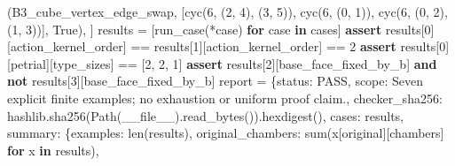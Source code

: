 \documentclass[
  10pt,
  letterpaper,
]{article}
\newenvironment{Shaded}{}{}
\newcommand{\BuiltInTok}[1]{\textcolor[rgb]{0.00,0.50,0.00}{#1}}
\newcommand{\ControlFlowTok}[1]{\textcolor[rgb]{0.00,0.44,0.13}{\textbf{#1}}}
\newcommand{\DecValTok}[1]{\textcolor[rgb]{0.25,0.63,0.44}{#1}}
\newcommand{\KeywordTok}[1]{\textcolor[rgb]{0.00,0.44,0.13}{\textbf{#1}}}
\newcommand{\NormalTok}[1]{#1}
\newcommand{\OperatorTok}[1]{\textcolor[rgb]{0.40,0.40,0.40}{#1}}
\newcommand{\StringTok}[1]{\textcolor[rgb]{0.25,0.44,0.63}{#1}}
\newcommand{\VariableTok}[1]{\textcolor[rgb]{0.10,0.09,0.49}{#1}}
\begin{document}
\begin{Shaded}
\begin{Highlighting}[]
\NormalTok{        (}\StringTok{\textquotesingle{}B3\_cube\_vertex\_edge\_swap\textquotesingle{}}\NormalTok{, [cyc(}\DecValTok{6}\NormalTok{, (}\DecValTok{2}\NormalTok{, }\DecValTok{4}\NormalTok{), (}\DecValTok{3}\NormalTok{, }\DecValTok{5}\NormalTok{)), cyc(}\DecValTok{6}\NormalTok{, (}\DecValTok{0}\NormalTok{, }\DecValTok{1}\NormalTok{)), cyc(}\DecValTok{6}\NormalTok{, (}\DecValTok{0}\NormalTok{, }\DecValTok{2}\NormalTok{), (}\DecValTok{1}\NormalTok{, }\DecValTok{3}\NormalTok{))], }\VariableTok{True}\NormalTok{),}
\NormalTok{    ]}
\NormalTok{    results }\OperatorTok{=}\NormalTok{ [run\_case(}\OperatorTok{*}\NormalTok{case) }\ControlFlowTok{for}\NormalTok{ case }\KeywordTok{in}\NormalTok{ cases]}
    \ControlFlowTok{assert}\NormalTok{ results[}\DecValTok{0}\NormalTok{][}\StringTok{\textquotesingle{}action\_kernel\_order\textquotesingle{}}\NormalTok{] }\OperatorTok{==}\NormalTok{ results[}\DecValTok{1}\NormalTok{][}\StringTok{\textquotesingle{}action\_kernel\_order\textquotesingle{}}\NormalTok{] }\OperatorTok{==} \DecValTok{2}
    \ControlFlowTok{assert}\NormalTok{ results[}\DecValTok{0}\NormalTok{][}\StringTok{\textquotesingle{}petrial\textquotesingle{}}\NormalTok{][}\StringTok{\textquotesingle{}type\_sizes\textquotesingle{}}\NormalTok{] }\OperatorTok{==}\NormalTok{ [}\DecValTok{2}\NormalTok{, }\DecValTok{2}\NormalTok{, }\DecValTok{1}\NormalTok{]}
    \ControlFlowTok{assert}\NormalTok{ results[}\DecValTok{2}\NormalTok{][}\StringTok{\textquotesingle{}base\_face\_fixed\_by\_b\textquotesingle{}}\NormalTok{] }\KeywordTok{and} \KeywordTok{not}\NormalTok{ results[}\DecValTok{3}\NormalTok{][}\StringTok{\textquotesingle{}base\_face\_fixed\_by\_b\textquotesingle{}}\NormalTok{]}
\NormalTok{    report }\OperatorTok{=}\NormalTok{ \{}\StringTok{\textquotesingle{}status\textquotesingle{}}\NormalTok{: }\StringTok{\textquotesingle{}PASS\textquotesingle{}}\NormalTok{, }\StringTok{\textquotesingle{}scope\textquotesingle{}}\NormalTok{: }\StringTok{\textquotesingle{}Seven explicit finite examples; no exhaustion or uniform proof claim.\textquotesingle{}}\NormalTok{,}
              \StringTok{\textquotesingle{}checker\_sha256\textquotesingle{}}\NormalTok{: hashlib.sha256(Path(}\VariableTok{\_\_file\_\_}\NormalTok{).read\_bytes()).hexdigest(),}
              \StringTok{\textquotesingle{}cases\textquotesingle{}}\NormalTok{: results, }\StringTok{\textquotesingle{}summary\textquotesingle{}}\NormalTok{: \{}\StringTok{\textquotesingle{}examples\textquotesingle{}}\NormalTok{: }\BuiltInTok{len}\NormalTok{(results),}
                 \StringTok{\textquotesingle{}original\_chambers\textquotesingle{}}\NormalTok{: }\BuiltInTok{sum}\NormalTok{(x[}\StringTok{\textquotesingle{}original\textquotesingle{}}\NormalTok{][}\StringTok{\textquotesingle{}chambers\textquotesingle{}}\NormalTok{] }\ControlFlowTok{for}\NormalTok{ x }\KeywordTok{in}\NormalTok{ results),}

\end{Highlighting}
\end{Shaded}
\end{document}
